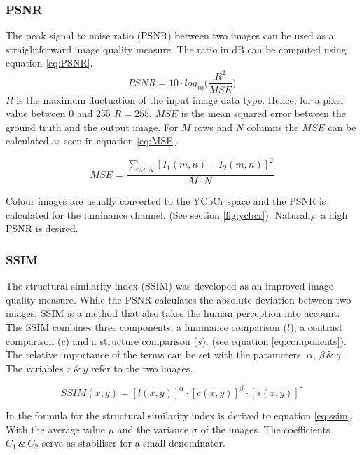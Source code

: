 \documentclass[
			fontsize = 12pt,
			paper = a4
			]
			{scrartcl}%
\newcommand{\?}{\ensuremath{^\texttt{\textbf [CITATION~NEEDED]}}}
\begin{document}
\subsubsection{PSNR}
\label{sec:PSNR}

The peak signal to noise ratio (PSNR) between two images can be used as a straightforward image quality measure. The ratio in dB can be computed using equation \ref{eq:PSNR}. 
\begin{equation}
    PSNR = 10 \cdot log_{10}\Big(\frac{R^2}{MSE}\Big)
    \label{eq:PSNR}
\end{equation}\newline
 $R$ is the maximum fluctuation of the input image data type. Hence, for a pixel value between 0 and 255 $R = 255$. $MSE$ is the mean squared error between the ground truth and the output image. For $M$ rows and $N$ columns the $MSE$ can be calculated as seen in equation \ref{eq:MSE}.

\begin{equation}
    MSE = \frac{\sum_{M,N}[I_1(m,n)-I_2(m,n)]^2}{M \cdot N}
    \label{eq:MSE}
\end{equation}

 Colour images are usually converted to the YCbCr space and the PSNR is calculated for the luminance channel. (See section \ref{fig:ycbcr}). Naturally, a high PSNR is desired. \cite{PSNR}

\subsubsection{SSIM}
\label{sec:ssim}
The structural similarity index (SSIM) was developed as an improved image quality measure. While the PSNR calculates the absolute deviation between two images, SSIM is a method that also takes the human perception into account. The SSIM combines three components, a luminance comparison ($l$), a contrast comparison ($c$) and a structure comparison ($s$). (see equation \ref{eq:components}). The relative importance of the terms can be set with the parameters: $\alpha,\,\beta\,\&\,\gamma$. The variables $x\,\&\,y$ refer to the two images.

\begin{equation}
    SSIM(x,y) = [l(x,y)]^\alpha \cdot [c(x,y)]^\beta \cdot [s(x,y)]^\gamma
    \label{eq:components}
\end{equation}

 In \cite{ssim} the formula for the structural similarity index is derived to equation \ref{eq:ssim}. With the average value $\mu$ and the variance $\sigma$ of the images. The coefficients $C_1\,\&\,C_2$ serve as stabiliser for a small denominator. 
\end{document}
